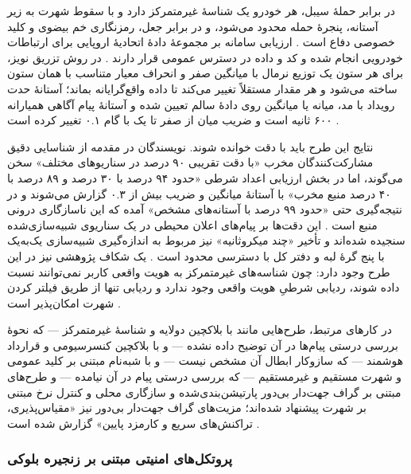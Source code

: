 در برابر حملهٔ سیبل، هر خودرو یک شناسهٔ غیرمتمرکز دارد و با سقوط شهرت به زیر آستانه، پنجرهٔ حمله محدود می‌شود، و در برابر جعل، رمزنگاری خم بیضوی و کلید خصوصی دفاع است \cite{feraudoDIVADIDbasedReputation2024}. ارزیابی سامانه بر مجموعهٔ دادهٔ  اتحادیهٔ اروپایی برای ارتباطات خودرویی انجام شده و کد و داده در دسترس عمومی قرار دارند \cite{feraudoDIVADIDbasedReputation2024}. در روش تزریق نویز، برای هر ستون یک توزیع نرمال با میانگین صفر و انحراف معیار متناسب با همان ستون ساخته می‌شود و هر مقدار مستقلاً تغییر می‌کند تا داده واقع‌گرایانه بماند؛ آستانهٔ حدت رویداد با مد، میانه یا میانگین روی دادهٔ سالم تعیین شده و آستانهٔ پیام آگاهی همیارانه ۶۰۰ ثانیه است و ضریب میان از صفر تا یک با گام ۰.۱ تغییر کرده است \cite{feraudoDIVADIDbasedReputation2024}.

نتایج این طرح باید با دقت خوانده شوند. نویسندگان در مقدمه از شناسایی دقیق مشارکت‌کنندگان مخرب «با دقت تقریبی ۹۰ درصد در سناریوهای مختلف» سخن می‌گوند، اما در بخش ارزیابی اعداد شرطی «حدود ۹۴ درصد با ۳۰ درصد و ۸۹ درصد با ۴۰ درصد منبع مخرب» با آستانهٔ میانگین و ضریب بیش از ۰.۳ گزارش می‌شوند و در نتیجه‌گیری حتی «حدود ۹۹ درصد با آستانه‌های مشخص» آمده که این ناسازگاری درونی منبع است \cite{feraudoDIVADIDbasedReputation2024}. این دقت‌ها بر پیام‌های اعلان محیطی در یک سناریوی شبیه‌سازی‌شده سنجیده شده‌اند و تأخیر «چند میکروثانیه» نیز مربوط به اندازه‌گیری شبیه‌سازی یک‌به‌یک با پنج گرهٔ لبه و دفتر کل با دسترسی محدود است \cite{feraudoDIVADIDbasedReputation2024}. یک شکاف پژوهشی نیز در این طرح وجود دارد: چون شناسه‌های غیرمتمرکز به هویت واقعی کاربر نمی‌توانند نسبت داده شوند، ردیابی شرطیِ هویت واقعی وجود ندارد و ردیابی تنها از طریق فیلتر کردن شهرت امکان‌پذیر است \cite{feraudoDIVADIDbasedReputation2024}.

در کارهای مرتبط، طرح‌هایی مانند  با بلاکچین دولایه و شناسهٔ غیرمتمرکز — که نحوهٔ بررسی درستی پیام‌ها در آن توضیح داده نشده — و  با بلاکچین کنسرسیومی و قرارداد هوشمند — که سازوکار ابطال آن مشخص نیست — و  با شبه‌نام مبتنی بر کلید عمومی و شهرت مستقیم و غیرمستقیم — که بررسی درستی پیام در آن نیامده — و طرح‌های مبتنی بر گراف جهت‌دار بی‌دور پارتیشن‌بندی‌شده و سازگاری محلی و کنترل نرخ مبتنی بر شهرت پیشنهاد شده‌اند؛ مزیت‌های گراف جهت‌دار بی‌دور نیز «مقیاس‌پذیری، تراکنش‌های سریع و کارمزد پایین» گزارش شده است \cite{feraudoDIVADIDbasedReputation2024}.

\subsubsection{پروتکل‌های امنیتی مبتنی بر زنجیره بلوکی}

